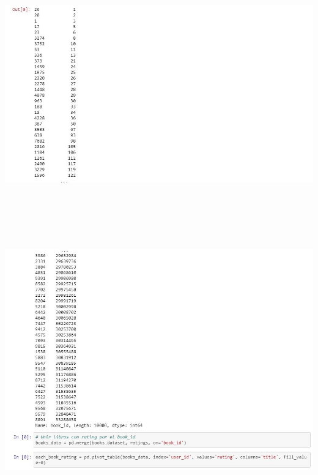 \begin{center}
\includegraphics[width=14cm, height=10cm]{./Imagenes/traba3.jpg}
\end{center}


\begin{center}
\includegraphics[width=14cm, height=12cm]{./Imagenes/traba4.jpg}
\end{center}


